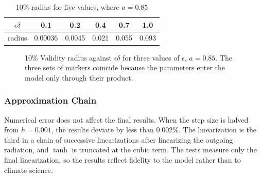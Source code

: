 	\begin{table}[H]
        \centering
        \begin{tabular}{cccccc}
            \toprule
            \textbf{$\epsilon\delta$} & 0.1 & 0.2 & 0.4 & 0.7 & 1.0 \\
            \midrule
            radius & 0.00036 & 0.0045 & 0.021 & 0.055 & 0.093 \\
            \bottomrule
        \end{tabular}
        \caption{10\% radius for five values, where $a=0.85$}
        \label{tab:varying-values-of-epsilion-delta}
    \end{table}
    
    \begin{figure}[H]
    \centering
    \caption{10\% Validity radius against $\epsilon\delta$ for three values of $\epsilon$, $a=0.85$. The three sets of markers coincide because the parameters enter the model only through their product.}
    \label{fig:epsdelta}
\end{figure}

    
  	\subsubsection{Approximation Chain}
  	Numerical error does not affect the final results. When the step size is halved from $h=0.001$, the results deviate by less than 0.002\%. The linearization is the third in a chain of successive linearizations after linearizing the outgoing radiation, and $\tanh$ is truncated at the cubic term. The tests measure only the final linearization, so the results reflect fidelity to the model rather than to climate science. 
  	
